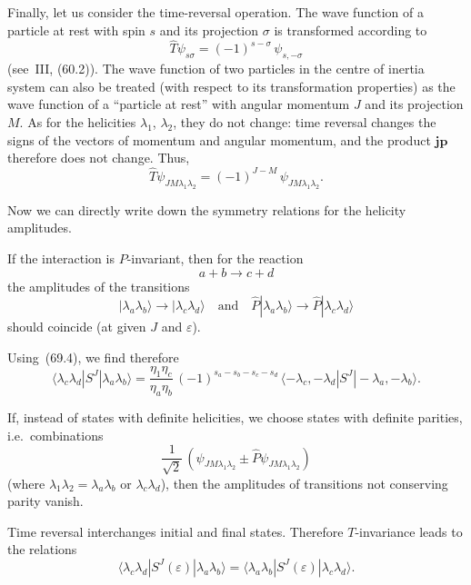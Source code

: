 Finally, let us consider the time-reversal operation. The wave function of a particle at rest with spin $s$ and its projection $\sigma$ is transformed according to
\[
\hat{T}\psi_{s\sigma} = (-1)^{s - \sigma}\,\psi_{s,-\sigma}
\]
(see~III, (60.2)). The wave function of two particles in the centre of inertia system can also be treated (with respect to its transformation properties) as the wave function of a ``particle at rest'' with angular momentum $J$ and its projection $M$. As for the helicities $\lambda_1$, $\lambda_2$, they do not change: time reversal changes the signs of the vectors of momentum and angular momentum, and the product $\mathbf{jp}$ therefore does not change. Thus,
\begin{equation}
\hat{T}\psi_{JM\lambda_1\lambda_2} = (-1)^{J - M}\,\psi_{JM\lambda_1\lambda_2}.
\tag{69.8}
\end{equation}

Now we can directly write down the symmetry relations for the helicity amplitudes.

If the interaction is $P$-invariant, then for the reaction
\[
a + b \to c + d
\]
the amplitudes of the transitions
\[
|\lambda_a\lambda_b\rangle \to |\lambda_c\lambda_d\rangle\quad\text{and}\quad \hat{P}|\lambda_a\lambda_b\rangle \to \hat{P}|\lambda_c\lambda_d\rangle
\]
should coincide (at given $J$ and $\varepsilon$).

Using~(69.4), we find therefore
\begin{equation}
\langle\lambda_c\lambda_d|S^J|\lambda_a\lambda_b\rangle =
\frac{\eta_1\eta_c}{\eta_a\eta_b}\,(-1)^{s_a - s_b - s_c - s_d}\,\langle -\lambda_c, -\lambda_d|S^J| -\lambda_a, -\lambda_b\rangle.
\tag{69.9}
\end{equation}

If, instead of states with definite helicities, we choose states with definite parities, i.e.\ combinations
\[
\frac{1}{\sqrt{2}}\,(\psi_{JM\lambda_1\lambda_2} \pm \hat{P}\psi_{JM\lambda_1\lambda_2})
\]
(where $\lambda_1\lambda_2 = \lambda_a\lambda_b$ or $\lambda_c\lambda_d$), then the amplitudes of transitions not conserving parity vanish.

Time reversal interchanges initial and final states. Therefore $T$-invariance leads to the relations
\begin{equation}
\langle\lambda_c\lambda_d|S^J(\varepsilon)|\lambda_a\lambda_b\rangle = \langle\lambda_a\lambda_b|S^J(\varepsilon)|\lambda_c\lambda_d\rangle.
\tag{69.10}
\end{equation}

